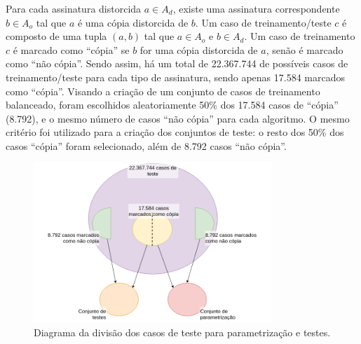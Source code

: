 Para cada assinatura distorcida $a \in A_d$, existe uma assinatura correspondente $b \in A_o$ tal que $a$ é uma cópia distorcida de $b$. Um caso de treinamento/teste $c$ é composto de uma tupla $(a, b)$ tal que $a \in A_o$ e $b \in A_d$. Um caso de treinamento $c$ é marcado como ``cópia'' se $b$ for uma cópia distorcida de $a$, senão é marcado como ``não cópia''. Sendo assim, há um total de 22.367.744 de possíveis casos de treinamento/teste para cada tipo de assinatura, sendo apenas 17.584 marcados como ``cópia''. Visando a criação de um conjunto de casos de treinamento balanceado, foram escolhidos aleatoriamente 50\% dos 17.584 casos de ``cópia'' (8.792), e o mesmo número de casos ``não cópia'' para cada algoritmo. O mesmo critério foi utilizado para a criação dos conjuntos de teste: o resto dos 50\% dos casos ``cópia'' foram selecionado, além de 8.792 casos ``não cópia''.

\begin{figure}[h]
    \centering
    \caption{Diagrama da divisão dos casos de teste para parametrização e testes.}
    \label{fig:casosteste}
  
    \includegraphics[width=0.8\textwidth]{dados/figuras/Casos}
    
    
\end{figure}




